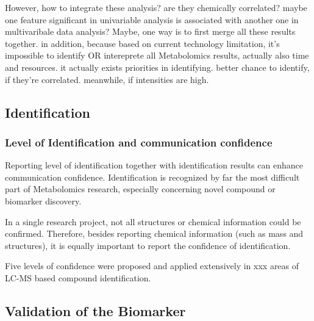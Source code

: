 However, how to integrate these analysis? are they chemically correlated? maybe one feature significant in univariable analysis is associated with another one in multivaribale data analysis? Maybe, one way is to first merge all these results together. in addition, because based on current technology limitation, it's impossible to identify OR intereprete all Metabolomics results, actually also time and resources. it actually exists priorities in identifying. better chance to identify, if they're correlated. meanwhile, if intensities are high.


\subsection{Identification}
\subsubsection{Level of Identification and communication confidence}
Reporting level of identification together with identification results can enhance communication confidence. Identification is recognized by far the most difficult part of Metabolomics research, especially concerning novel compound or biomarker discovery. 

In a single research project, not all structures or chemical information could be confirmed. Therefore, besides reporting chemical information (such as mass and structures), it is equally important to report the confidence of identification.

Five levels of confidence were proposed and applied extensively in xxx areas of LC-MS based compound identification\cite{?}.

\subsection{Validation of the Biomarker}

